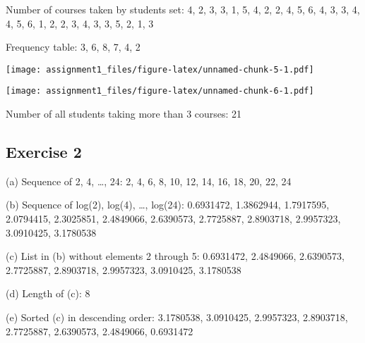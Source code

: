 \documentclass[]{article}
\begin{document}
Number of courses taken by students set: 4, 2, 3, 3, 1, 5, 4, 2, 2, 4,
5, 6, 4, 3, 3, 4, 4, 5, 6, 1, 2, 2, 3, 4, 3, 3, 5, 2, 1, 3

 Frequency table: 3, 6, 8, 7, 4, 2

\texttt{[image: assignment1\_files/figure-latex/unnamed-chunk-5-1.pdf]}

\texttt{[image: assignment1\_files/figure-latex/unnamed-chunk-6-1.pdf]}

Number of all students taking more than 3 courses: 21

\subsection{Exercise 2}\label{exercise-2-1}

(a) Sequence of 2, 4, \ldots{}, 24: 2, 4, 6, 8, 10, 12, 14, 16, 18, 20,
22, 24

(b) Sequence of log(2), log(4), \ldots{}, log(24): 0.6931472, 1.3862944,
1.7917595, 2.0794415, 2.3025851, 2.4849066, 2.6390573, 2.7725887,
2.8903718, 2.9957323, 3.0910425, 3.1780538

(c) List in (b) without elements 2 through 5: 0.6931472, 2.4849066,
2.6390573, 2.7725887, 2.8903718, 2.9957323, 3.0910425, 3.1780538

(d) Length of (c): 8

(e) Sorted (c) in descending order: 3.1780538, 3.0910425, 2.9957323,
2.8903718, 2.7725887, 2.6390573, 2.4849066, 0.6931472
\end{document}
